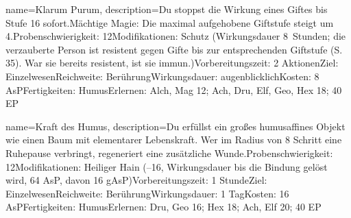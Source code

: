 {
    name={Klarum Purum},
    description={Du stoppst die Wirkung eines Giftes bis Stufe 16 sofort.\newline Mächtige Magie: Die maximal aufgehobene Giftstufe steigt um 4.\newline Probenschwierigkeit: 12\newline Modifikationen: Schutz (Wirkungsdauer 8 Stunden; die verzauberte Person ist resistent gegen Gifte bis zur entsprechenden Giftstufe (S. 35). War sie bereits resistent, ist sie immun.)\newline Vorbereitungszeit: 2 Aktionen\newline Ziel: Einzelwesen\newline Reichweite: Berührung\newline Wirkungsdauer: augenblicklich\newline Kosten: 8 AsP\newline Fertigkeiten: Humus\newline Erlernen: Alch, Mag 12; Ach, Dru, Elf, Geo, Hex 18; 40 EP}
}


{
    name={Kraft des Humus},
    description={Du erfüllst ein großes humusaffines Objekt wie einen Baum mit elementarer Lebenskraft. Wer im Radius von 8 Schritt eine Ruhepause verbringt, regeneriert eine zusätzliche Wunde.\newline Probenschwierigkeit: 12\newline Modifikationen: Heiliger Hain (–16, Wirkungsdauer bis die Bindung gelöst wird, 64 AsP, davon 16 gAsP)\newline Vorbereitungszeit: 1 Stunde\newline Ziel: Einzelwesen\newline Reichweite: Berührung\newline Wirkungsdauer: 1 Tag\newline Kosten: 16 AsP\newline Fertigkeiten: Humus\newline Erlernen: Dru, Geo 16; Hex 18; Ach, Elf 20; 40 EP}
}


